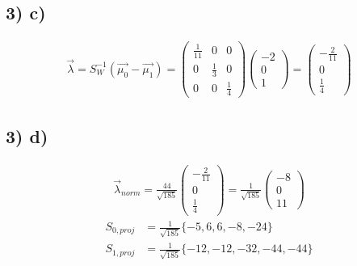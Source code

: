 \subsection*{3) c)}
\begin{align*}
  \vec{\lambda} = S_W^{-1}(\vec{\mu_0}-\vec{\mu_1}) = \begin{pmatrix} \frac{1}{11}&0&0\\ 0&\frac{1}{3}&0\\ 0&0&\frac{1}{4}\end{pmatrix} \begin{pmatrix}-2 \\ 0 \\ 1 \end{pmatrix} = \begin{pmatrix} -\frac{2}{11} \\ 0 \\ \frac{1}{4} \end{pmatrix}
\end{align*}



\subsection*{3) d)}
\begin{align*}
  \vec{\lambda}_{norm} = \frac{44}{\sqrt{185}} \begin{pmatrix} -\frac{2}{11} \\ 0 \\ \frac{1}{4} \end{pmatrix} = \frac{1}{\sqrt{185}}  \begin{pmatrix} -8 \\ 0 \\ 11 \end{pmatrix}
\end{align*}
\begin{align*}
  S_{0,proj} &= \frac{1}{\sqrt{185}} \{-5, 6, 6, -8, -24\} \\
  S_{1,proj} &= \frac{1}{\sqrt{185}} \{-12, -12, -32, -44, -44\}
\end{align*}

